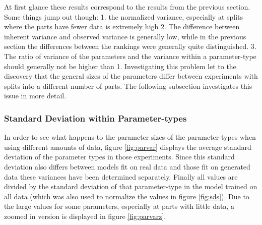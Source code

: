 \documentclass{scrartcl}
\begin{document}
At first glance these results correspond to the results from the previous section. Some things jump out though: 1. the normalized variance, especially at splits where the parts have fewer data is extremely high 2. The difference between inherent variance and observed variance is generally low, while in the previous section the differences between the rankings were generally quite distinguished. 3. The ratio of variance of the parameters and the variance within a parameter-type should generally not be higher than 1. Investigating this problem let to the discovery that the general sizes of the parameters differ between experiments with splits into a different number of parts. The following subsection investigates this issue in more detail.




\subsubsection{Standard Deviation within Parameter-types}
\label{sec:parvar}
In order to see what happens to the parameter sizes of the parameter-types when using different amounts of data, figure \ref{fig:parvar} displays the average standard deviation of the parameter types in those experiments. Since this standard deviation also differs between models fit on real data and those fit on generated data these variances have been determined separately. Finally all values are divided by the standard deviation of that parameter-type in the model trained on all data (which was also used to normalize the values in figure \ref{fig:sds}). Due to the large values for some parameters, especially at parts with little data, a zoomed in version is displayed in figure \ref{fig:parvarz}. 
\end{document}
